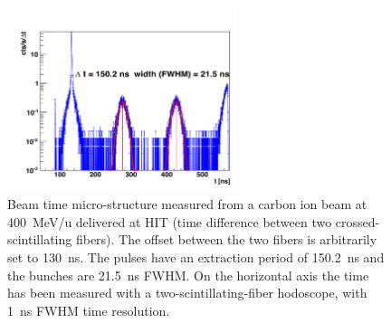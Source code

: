 \begin{figure} [!hbtp]	
  \centering
	\includegraphics[width=0.6\textwidth]{./Figure/BeamTimeStruct.png} 
  \caption{Beam time micro-structure measured from a carbon ion beam at 400~MeV/u delivered at HIT (time difference between two crossed-scintillating fibers). The offset between the two fibers is arbitrarily set to 130~ns. The pulses have an extraction period of 150.2~ns and the bunches are 21.5~ns FWHM.  On the horizontal axis the time has been measured with a two-scintillating-fiber hodoscope, with 1~ns FWHM time resolution.}
  \label{fig:fig_structure_temps_faisceau_HIT_2013_CC_simulation_Hadronth}
\end{figure}


